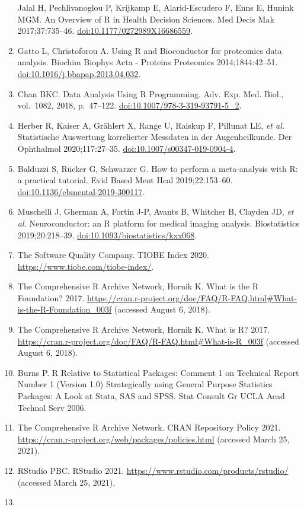 \documentclass[
]{book}
\begin{document}
\begin{enumerate}
  Jalal H, Pechlivanoglou P, Krijkamp E, Alarid-Escudero F, Enns E, Hunink MGM. An Overview of R in Health Decision Sciences. Med Decis Mak 2017;37:735--46. \url{doi:10.1177/0272989X16686559}.
\item
  Gatto L, Christoforou A. Using R and Bioconductor for proteomics data analysis. Biochim Biophys Acta - Proteins Proteomics 2014;1844:42--51. \url{doi:10.1016/j.bbapap.2013.04.032}.
\item
  Chan BKC. Data Analysis Using R Programming. Adv. Exp. Med. Biol., vol.~1082, 2018, p.~47--122. \url{doi:10.1007/978-3-319-93791-5_2}.
\item
  Herber R, Kaiser A, Grählert X, Range U, Raiskup F, Pillunat LE, \emph{et al.} Statistische Auswertung korrelierter Messdaten in der Augenheilkunde. Der Ophthalmol 2020;117:27--35. \url{doi:10.1007/s00347-019-0904-4}.
\item
  Balduzzi S, Rücker G, Schwarzer G. How to perform a meta-analysis with R: a practical tutorial. Evid Based Ment Heal 2019;22:153--60. \url{doi:10.1136/ebmental-2019-300117}.
\item
  Muschelli J, Gherman A, Fortin J-P, Avants B, Whitcher B, Clayden JD, \emph{et al.} Neuroconductor: an R platform for medical imaging analysis. Biostatistics 2019;20:218--39. \url{doi:10.1093/biostatistics/kxx068}.
\item
  The Software Quality Company. TIOBE Index 2020. \url{https://www.tiobe.com/tiobe-index/}.
\item
  The Comprehensive R Archive Network, Hornik K. What is the R Foundation? 2017. \url{https://cran.r-project.org/doc/FAQ/R-FAQ.html\#What-is-the-R-Foundation_003f} (accessed August 6, 2018).
\item
  The Comprehensive R Archive Network, Hornik K. What is R? 2017. \url{https://cran.r-project.org/doc/FAQ/R-FAQ.html\#What-is-R_003f} (accessed August 6, 2018).
\item
  Burns P. R Relative to Statistical Packages: Comment 1 on Technical Report Number 1 (Version 1.0) Strategically using General Purpose Statistics Packages: A Look at Stata, SAS and SPSS. Stat Consult Gr UCLA Acad Technol Serv 2006.
\item
  The Comprehensive R Archive Network. CRAN Repository Policy 2021. \url{https://cran.r-project.org/web/packages/policies.html} (accessed March 25, 2021).
\item
  RStudio PBC. RStudio 2021. \url{https://www.rstudio.com/products/rstudio/} (accessed March 25, 2021).
\item

\end{enumerate}
\end{document}
